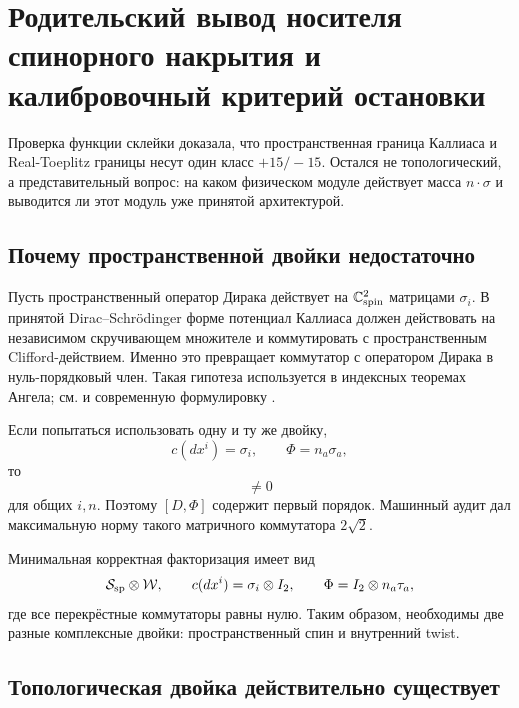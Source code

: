 \chapter{Родительский вывод носителя спинорного накрытия и калибровочный критерий остановки}

Проверка функции склейки доказала, что пространственная граница Каллиаса и Real-Toeplitz
границы несут один класс $+15/-15$. Остался не топологический, а
представительный вопрос: на каком физическом модуле действует масса
$n\cdot\sigma$ и выводится ли этот модуль уже принятой архитектурой.

\section{Почему пространственной двойки недостаточно}

Пусть пространственный оператор Дирака действует на
$\mathbb C^2_{\rm spin}$ матрицами $\sigma_i$. В принятой
Dirac--Schrödinger форме потенциал Каллиаса должен действовать на
независимом скручивающем множителе и коммутировать с пространственным
Clifford-действием. Именно это превращает коммутатор с оператором Дирака
в нуль-порядковый член. Такая гипотеза используется в индексных теоремах
Ангела; см.  и современную
формулировку .

Если попытаться использовать одну и ту же двойку,
\begin{equation}
 c(dx^i)=\sigma_i,
 \qquad
 \Phi=n_a\sigma_a,
\end{equation}
то
\begin{equation}
 [\sigma_i,n_a\sigma_a]\ne0
\end{equation}
для общих $i,n$. Поэтому $[D,\Phi]$ содержит первый порядок. Машинный
аудит дал максимальную норму такого матричного коммутатора $2\sqrt2$.

Минимальная корректная факторизация имеет вид
\begin{equation}
 \mathcal S_{\rm sp}\otimes\mathcal W,
 \qquad
 c(dx^i)=\sigma_i\otimes I_2,
 \qquad
 \Phi=I_2\otimes n_a\tau_a,
 \label{eq:v6-independent-callias-doublet}
\end{equation}
где все перекрёстные коммутаторы равны нулю. Таким образом, необходимы
две разные комплексные двойки: пространственный спин и внутренний twist.

\section{Топологическая двойка действительно существует}

